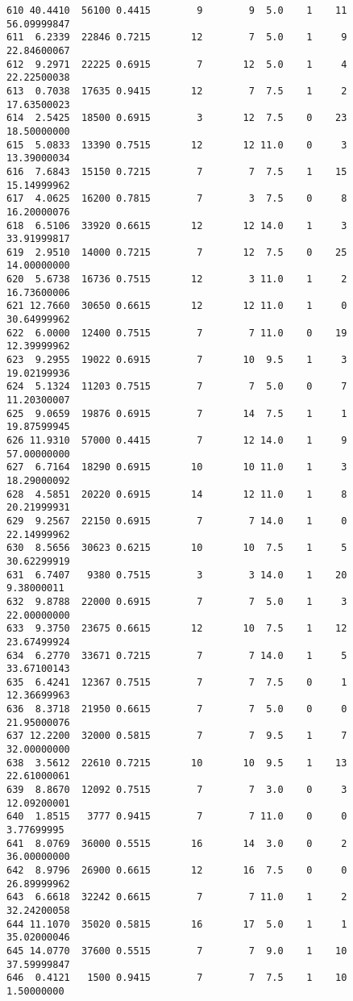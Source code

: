 \documentclass[
  letterpaper,
  DIV=11,
  numbers=noendperiod]{scrreprt}
\begin{document}
\begin{verbatim}
610 40.4410  56100 0.4415        9        9  5.0    1    11 56.09999847
611  6.2339  22846 0.7215       12        7  5.0    1     9 22.84600067
612  9.2971  22225 0.6915        7       12  5.0    1     4 22.22500038
613  0.7038  17635 0.9415       12        7  7.5    1     2 17.63500023
614  2.5425  18500 0.6915        3       12  7.5    0    23 18.50000000
615  5.0833  13390 0.7515       12       12 11.0    0     3 13.39000034
616  7.6843  15150 0.7215        7        7  7.5    1    15 15.14999962
617  4.0625  16200 0.7815        7        3  7.5    0     8 16.20000076
618  6.5106  33920 0.6615       12       12 14.0    1     3 33.91999817
619  2.9510  14000 0.7215        7       12  7.5    0    25 14.00000000
620  5.6738  16736 0.7515       12        3 11.0    1     2 16.73600006
621 12.7660  30650 0.6615       12       12 11.0    1     0 30.64999962
622  6.0000  12400 0.7515        7        7 11.0    0    19 12.39999962
623  9.2955  19022 0.6915        7       10  9.5    1     3 19.02199936
624  5.1324  11203 0.7515        7        7  5.0    0     7 11.20300007
625  9.0659  19876 0.6915        7       14  7.5    1     1 19.87599945
626 11.9310  57000 0.4415        7       12 14.0    1     9 57.00000000
627  6.7164  18290 0.6915       10       10 11.0    1     3 18.29000092
628  4.5851  20220 0.6915       14       12 11.0    1     8 20.21999931
629  9.2567  22150 0.6915        7        7 14.0    1     0 22.14999962
630  8.5656  30623 0.6215       10       10  7.5    1     5 30.62299919
631  6.7407   9380 0.7515        3        3 14.0    1    20  9.38000011
632  9.8788  22000 0.6915        7        7  5.0    1     3 22.00000000
633  9.3750  23675 0.6615       12       10  7.5    1    12 23.67499924
634  6.2770  33671 0.7215        7        7 14.0    1     5 33.67100143
635  6.4241  12367 0.7515        7        7  7.5    0     1 12.36699963
636  8.3718  21950 0.6615        7        7  5.0    0     0 21.95000076
637 12.2200  32000 0.5815        7        7  9.5    1     7 32.00000000
638  3.5612  22610 0.7215       10       10  9.5    1    13 22.61000061
639  8.8670  12092 0.7515        7        7  3.0    0     3 12.09200001
640  1.8515   3777 0.9415        7        7 11.0    0     0  3.77699995
641  8.0769  36000 0.5515       16       14  3.0    0     2 36.00000000
642  8.9796  26900 0.6615       12       16  7.5    0     0 26.89999962
643  6.6618  32242 0.6615        7        7 11.0    1     2 32.24200058
644 11.1070  35020 0.5815       16       17  5.0    1     1 35.02000046
645 14.0770  37600 0.5515        7        7  9.0    1    10 37.59999847
646  0.4121   1500 0.9415        7        7  7.5    1    10  1.50000000

\end{verbatim}
\end{document}
